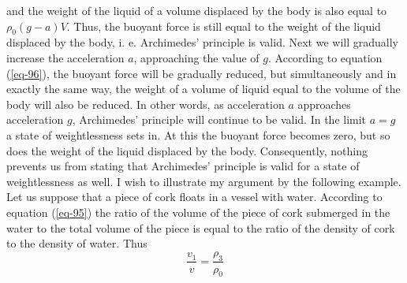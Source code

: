 \documentclass[a4paper,sfsidenotes]{tufte-book}
\begin{document}
and the weight of the liquid of a volume displaced by the body is also equal to $\rho_{0} (g-a)V$. Thus, the buoyant force is still equal to the weight of the liquid displaced by the body, i. e. Archimedes' principle is valid. Next we will gradually increase the acceleration $a$, approaching the value of $g$. According to equation (\ref{eq-96}), the buoyant force will be gradually reduced, but simultaneously and in exactly the same way, the weight of a volume of liquid equal to the volume of the body will also be reduced. In other words, as acceleration $a$ approaches acceleration $g$, Archimedes' principle will continue to be valid. In the limit $a=g$ a state of weightlessness sets in. At this the buoyant force becomes zero, but so does the weight of the liquid displaced by the body. Consequently, nothing prevents us from stating that Archimedes' principle is valid for a state of weightlessness as well. I wish to illustrate my argument by the following example. Let us suppose that a piece of cork floats in a vessel with water. According to equation (\ref{eq-95}) the ratio of the volume of the piece of cork submerged in the water to the total volume of the piece is equal to the ratio of the density of cork to the density of water. Thus
\begin{equation}%
\frac{v_{1}}{v} = \frac{\rho_{3}}{\rho_{0}}
\label{eq-97}
\end{equation}
\end{document}
